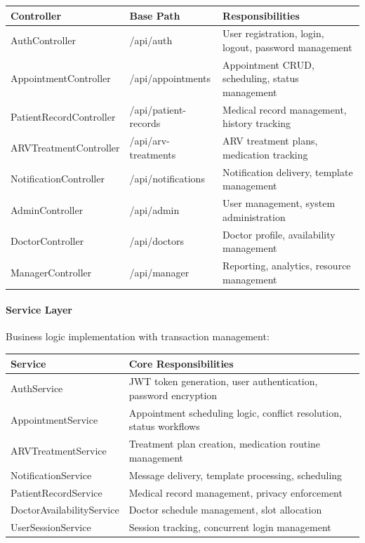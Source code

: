 \documentclass[12pt,a4paper]{article}
\begin{document}
\begin{longtable}{|p{3cm}|p{4cm}|p{7cm}|}
\hline
\textbf{Controller} & \textbf{Base Path} & \textbf{Responsibilities} \\
\hline
AuthController & /api/auth & User registration, login, logout, password management \\
\hline
AppointmentController & /api/appointments & Appointment CRUD, scheduling, status management \\
\hline
PatientRecordController & /api/patient-records & Medical record management, history tracking \\
\hline
ARVTreatmentController & /api/arv-treatments & ARV treatment plans, medication tracking \\
\hline
NotificationController & /api/notifications & Notification delivery, template management \\
\hline
AdminController & /api/admin & User management, system administration \\
\hline
DoctorController & /api/doctors & Doctor profile, availability management \\
\hline
ManagerController & /api/manager & Reporting, analytics, resource management \\
\hline
\end{longtable}

\paragraph{Service Layer}
Business logic implementation with transaction management:

\begin{longtable}{|p{3cm}|p{9cm}|}
\hline
\textbf{Service} & \textbf{Core Responsibilities} \\
\hline
AuthService & JWT token generation, user authentication, password encryption \\
\hline
AppointmentService & Appointment scheduling logic, conflict resolution, status workflows \\
\hline
ARVTreatmentService & Treatment plan creation, medication routine management \\
\hline
NotificationService & Message delivery, template processing, scheduling \\
\hline
PatientRecordService & Medical record management, privacy enforcement \\
\hline
DoctorAvailabilityService & Doctor schedule management, slot allocation \\
\hline
UserSessionService & Session tracking, concurrent login management \\
\hline
\end{longtable}
\end{document}
